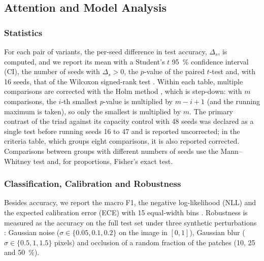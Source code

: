 \subsection{Attention and Model Analysis}
\label{sec:analisis}
\subsubsection{Statistics} For each pair of variants, the per-seed difference in test accuracy, $\Delta_s$, is computed, and we report its mean with a Student's $t$ 95~\% confidence interval (CI), the number of seeds with $\Delta_s>0$, the $p$-value of the paired $t$-test and, with 16 seeds, that of the Wilcoxon signed-rank test \citep{wilcoxon1945individual}. Within each table, multiple comparisons are corrected with the Holm method \citep{holm1979simple}, which is step-down: with $m$ comparisons, the $i$-th smallest $p$-value is multiplied by $m-i+1$ (and the running maximum is taken), so only the smallest is multiplied by $m$. The primary contrast of the triad against its capacity control with 48 seeds was declared as a single test before running seeds 16 to 47 and is reported uncorrected; in the criteria table, which groups eight comparisons, it is also reported corrected. Comparisons between groups with different numbers of seeds use the Mann--Whitney test and, for proportions, Fisher's exact test.

\subsubsection{Classification, Calibration and Robustness} Besides accuracy, we report the macro F1, the negative log-likelihood (NLL) and the expected calibration error (ECE) with 15 equal-width bins \citep{guo2017calibration}. Robustness is measured as the accuracy on the full test set under three synthetic perturbations \citep{hendrycks2019benchmarking}: Gaussian noise ($\sigma\in\{0.05, 0.1, 0.2\}$ on the image in $[0,1]$), Gaussian blur ($\sigma\in\{0.5, 1, 1.5\}$ pixels) and occlusion of a random fraction of the patches (10, 25 and 50~\%).

